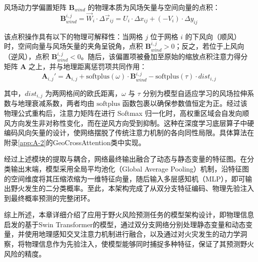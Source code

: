 风场动力学偏置矩阵 $\mathbf{B}_{wind}$ 的物理本质为风场矢量与空间向量的点积：
\begin{equation}
    \mathbf{B}_{wind}^{i,j} = \vec{W}_i \cdot \Delta \vec{r}_{ij} = U_i \cdot \Delta x_{ij} + (-V_i) \cdot \Delta y_{ij}
\end{equation}

该点积操作具有以下的物理可解释性：当网格 $j$ 位于网格 $i$ 的下风向（顺风）时，空间向量与风场矢量的夹角呈锐角，点积 $\mathbf{B}_{wind}^{i,j} > 0$；反之，若位于上风向（逆风），点积 $\mathbf{B}_{wind}^{i,j} < 0$。随后，该偏置项被叠加至原始的缩放点积注意力得分矩阵 $\mathbf{A}$ 之上，并与地理距离惩罚项共同作用：
\begin{equation}
    \mathbf{A}_{i,j}' = \mathbf{A}_{i,j} + \text{softplus}(\omega) \cdot \mathbf{B}_{wind}^{i,j} - \text{softplus}(\tau) \cdot dist_{i,j}
\end{equation}

其中，$dist_{i,j}$ 为两网格间的欧氏距离，$\omega$ 与 $\tau$ 分别为模型自适应学习的风场拉伸系数与地理衰减系数，两者均由 $\text{softplus}$ 函数包裹以确保参数值恒定为正。经过该物理公式重构后，注意力矩阵在进行 Softmax 归一化时，高权重区域会自发向顺风方向发生非对称性变化，而在逆风方向受到抑制。这种在深度学习底层算子中硬编码风向矢量的设计，使网络摆脱了传统注意力机制的各向同性局限。具体算法在附录\ref{app:A-2}的GeoCrossAttention类中实现。

经过上述模块的提取与耦合，网络最终输出融合了动态与静态变量的特征图。在分类输出末端，模型采用全局平均池化（Global Average Pooling）机制，沿特征图的空间维度将其压缩浓缩为一维特征向量，随后输入多层感知机（MLP），即可输出野火发生的二分类概率。至此，本架构完成了从双分支特征编码、物理先验注入到最终概率预测的完整闭环。

综上所述，本章详细介绍了应用于野火风险预测任务的模型架构设计，即物理信息启发的基于Swin Transformer的模型，通过双分支网络分别处理静态变量和动态变量，并使用地理感知交叉注意力机制进行融合，以及通过对火灾发生的动力学洞察，将物理信息作为先验注入，使模型能够同时捕捉多种特征，保证了其预测野火风险的精度。
